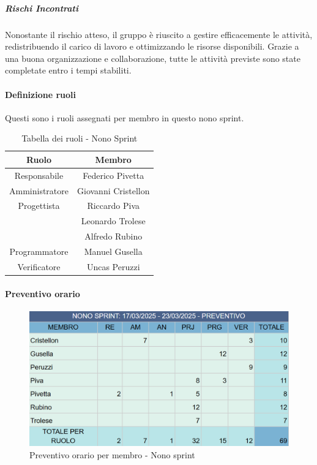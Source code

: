 \documentclass[10pt]{article}
\begin{document}
{{{{{{{{{{        \subparagraph*{Rischi Incontrati}\mbox{}
        
        Nonostante il rischio atteso, il gruppo è riuscito a gestire efficacemente le attività, redistribuendo il carico di lavoro e ottimizzando le risorse disponibili. Grazie a una buona organizzazione e collaborazione, tutte le attività previste sono state completate entro i tempi stabiliti.
        
        \paragraph{Definizione ruoli}\mbox{}\vspace{0.4em}
        
        Questi sono i ruoli assegnati per membro in questo nono sprint.\\
        \begin{table}[H]
            \centering
            \begin{tabular}{|c|c|}
            \hline
            \rowcolor{gray!25}
            \textbf{Ruolo} & \textbf{Membro}\\
            \hline
            Responsabile & Federico Pivetta \\
            \hline
            Amministratore & Giovanni Cristellon \\
            \hline
            Progettista & Riccardo Piva \\ & Leonardo Trolese \\ & Alfredo Rubino \\
            \hline
            Programmatore & Manuel Gusella \\
            \hline
            Verificatore & Uncas Peruzzi \\
            \hline
            \end{tabular}
            \caption{Tabella dei ruoli - Nono Sprint}
        \end{table}

        \paragraph{Preventivo orario}\mbox{}\vspace{0.4em}
        \begin{figure}[H]
            \centering
            \includegraphics[width=0.6\linewidth]{preventivoOreNonoSprint.PNG}
            \caption{Preventivo orario per membro - Nono sprint}
            \label{fig:Preventivo orario per membro - Nono sprint}
        \end{figure}

}}}}}}}}}}
\end{document}
